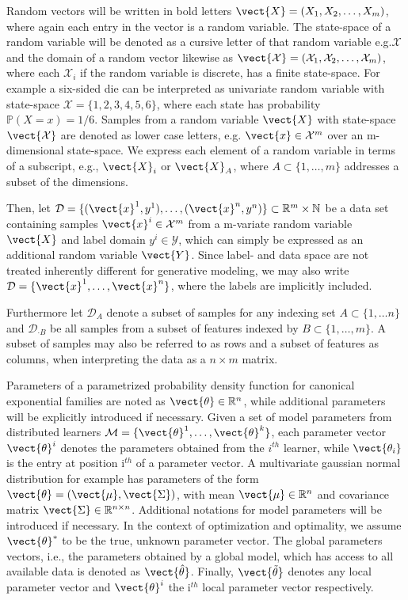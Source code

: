     Random vectors will be written in bold letters $\vect{X} = (X_1, X_2, \ldots, X_m)$, where again each entry in the vector is a random variable.
    The state-space of a random variable will be denoted as a cursive letter of that random variable e.g.$\mathcal{X}$ and the domain of a random vector likewise as $\vect{\mathcal{X}} = (\mathcal{X}_1, \mathcal{X}_2, \ldots, \mathcal{X}_m)$, where each $\mathcal{X}_i$ if the random variable is discrete, has a finite state-space.
    For example a six-sided die can be interpreted as univariate random variable with state-space $\mathcal{X} = \{1,2,3,4,5,6\}$, where each state has probability $\mathbb{P}(X=x) = 1/6$.
    Samples from a random variable $\vect{X}$  with state-space $\vect{\mathcal{X}}$ are denoted as lower case letters, e.g. $\vect{x} \in \mathcal{X}^m$ over an m-dimensional state-space.
    We express each element of a random variable in terms of a subscript, e.g., $\vect{X}_i$ or $\vect{X}_A$, where $A \subset\{1, \ldots, m\} $ addresses a subset of the dimensions.

    Then, let $\mathcal{D} = \{(\vect{x}^1, y^1), \ldots, (\vect{x}^n, y^n)\} \subset \mathbb{R}^m \times \mathbb{N}$ be a data set containing samples $\vect{x}^i \in \mathcal{X}^m$ from a m-variate random variable $\vect{X}$ and label domain $y^i \in \mathcal{Y}$, which can simply be expressed as an additional random variable $\vect{Y}$.
    Since label- and data space are not treated inherently different for generative modeling, we may also write $\mathcal{D} = \{\vect{x}^1, \ldots, \vect{x}^n\}$, where the labels are implicitly included.

    Furthermore let $\mathcal{D}_A$ denote a subset of samples for any indexing set $A\subset \{1, \ldots n\}$ and $\mathcal{D}_{\cdot B}$ be all samples from a subset of features indexed by $B \subset \{1, \ldots, m\}$.
    A subset of samples may also be referred to as rows and a subset of features as columns, when interpreting the data as a $n \times m$ matrix.  

    Parameters of a parametrized probability density function for canonical exponential families are noted as $\vect{\theta} \in \mathbb{R}^n$, while additional parameters will be explicitly introduced if necessary.
    Given a set of model parameters from distributed learners $\mathcal{M} = \{\vect{\theta}^1,  \ldots, \vect{\theta}^k\}$, each parameter vector $\vect{\theta}^i$ denotes the parameters obtained from the  $i^{th}$ learner, while $\vect{\theta_i}$ is the entry at position i$^{th}$ of a parameter vector.
    A multivariate gaussian normal distribution for example has parameters of the form $\vect{\theta} = (\vect{\mu}, \vect{\Sigma})$, with mean $\vect{\mu} \in \mathbb{R}^{n}$ and covariance matrix $\vect{\Sigma} \in \mathbb{R}^{n \times n}$.
    Additional notations for model parameters will be introduced if necessary.
    In the context of optimization and optimality, we assume $\vect{\theta}^*$ to be the true, unknown parameter vector.
    The global parameters vectors, i.e., the parameters obtained by a global model, which has access to all available data is denoted as  $\vect{\hat{\theta}}$.
    Finally, $\vect{\tilde{\theta}}$ denotes any local parameter vector and $\vect{\theta}^{i}$ the i$^{th}$ local parameter vector respectively.

